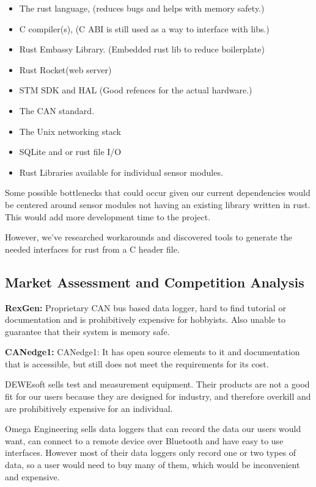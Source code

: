 \begin{itemize}
\tightlist
\item
  The rust language, (reduces bugs and helps with memory safety.)
\item
  C compiler(s), (C ABI is still used as a way to interface with libs.)
\item
  Rust Embassy Library. (Embedded rust lib to reduce boilerplate)
\item
  Rust Rocket(web server)
\item
  STM SDK and HAL (Good refences for the actual hardware.)
\item
  The CAN standard.
\item
  The Unix networking stack
\item
  SQLite and or rust file I/O
\item
  Rust Libraries available for individual sensor modules.
\end{itemize}

Some possible bottlenecks that could occur given our current
dependencies would be centered around sensor modules not having an
existing library written in rust. This would add more development time
to the project.

However, we've researched workarounds and discovered tools to generate
the needed interfaces for rust from a C header file.

\hypertarget{market-assessment-and-competition-analysis}{%
\subsection{Market Assessment and Competition
Analysis}\label{market-assessment-and-competition-analysis}}

\textbf{RexGen:} Proprietary CAN bus based data logger, hard to find
tutorial or documentation and is prohibitively expensive for hobbyists.
Also unable to guarantee that their system is memory safe.

\textbf{CANedge1:} CANedge1: It has open source elements to it and
documentation that is accessible, but still does not meet the
requirements for its cost.

DEWEsoft sells test and measurement equipment. Their products are not a
good fit for our users because they are designed for industry, and
therefore overkill and are prohibitively expensive for an individual.

Omega Engineering sells data loggers that can record the data our users
would want, can connect to a remote device over Bluetooth and have easy
to use interfaces. However most of their data loggers only record one or
two types of data, so a user would need to buy many of them, which would
be inconvenient and expensive.

